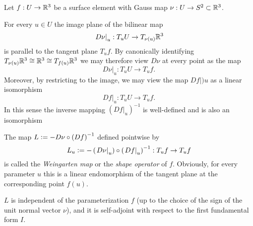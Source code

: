 \documentclass[../main.tex]{subfiles}
\begin{document}
\begin{definition}\label{Curvature:ShapeOperator}
    Let $f:U\to\mathbb{R}^{3}$ be a surface element with Gauss map $\nu:U\to S^2\subset\mathbb{R}^3$.
    \begin{APAenumerate}
        \item For every $u\in U$ the image plane of the bilinear map
        \begin{equation*}
            \left.D\nu\right|_u:T_uU\to T_{\nu(u)}\mathbb{R}^3
        \end{equation*}
        is parallel to the tangent plane $T_uf$.
        By canonically identifying $T_{\nu(u)}\mathbb{R}^3\cong\mathbb{R}^3\cong T_{f(u)}\mathbb{R}^3$
        we may therefore view $D\nu$ at every point as the map
        \begin{equation*}
            \left.D\nu\right|_u:T_uU\to T_uf \text{.}
        \end{equation*}
        Moreover, by restricting to the image,
        we may view the map $\left.Df\right|)u$ as a linear isomorphism
        \begin{equation*}
            \left.Df\right|_u:T_uU\to T_uf \text{.}
        \end{equation*}
        In this sense
        the inverse mapping $\left(\left.Df\right|_u\right)^{-1}$ is well-defined
        and is also an isomorphism
        \item The map $L\vcentcolon= -D\nu\circ\left(Df\right)^{-1}$ defined pointwise by
        \begin{equation*}
            L_u
            \vcentcolon= -\left(\left.D\nu\right|_u\right)\circ\left(\left.Df\right|_u\right)^{-1}
            : T_uf\to T_uf
        \end{equation*}
        is called the \textit{Weingarten map} or the \textit{shape operator} of $f$.
        Obviously, for every parameter $u$ this is a linear endomorphism of the tangent plane at the corresponding point $f(u)$.
        \item $L$ is independent of the parameterization $f$ (up to the choice of the sign of the unit normal vector $\nu$),
        and it is self-adjoint with respect to the first fundamental form $I$.
    \end{APAenumerate}
\end{definition}
\end{document}
